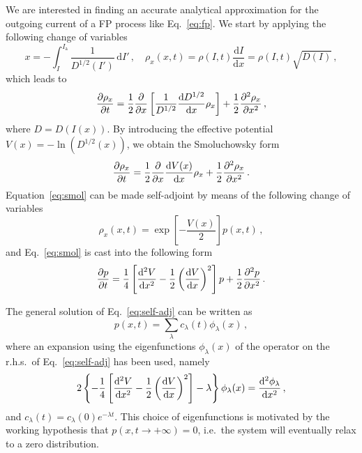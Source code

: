 We are interested in finding an accurate analytical approximation for the outgoing current of a FP process like Eq.~\eqref{eq:fp}. We start  by applying the following change of variables
\begin{equation}
    x = -\int_I^{I_\mathrm{a}} \frac{1}{D^{1/2}(I')}\,\mathrm{d}I'\,,\quad \rho_x(x,t)=\rho(I,t)\frac{\mathrm{d}I}{\mathrm{d}x}=\rho(I,t)\sqrt{D(I)} \, ,
\end{equation}
which leads to
\begin{equation}
    \pdv{\rho_x}{t} = \frac{1}{2}\pdv{x} \left[\frac{1}{D^{1/2}}\dv{D^{1/2}}{x}\rho_x\right]+\frac{1}{2}\pdv[2]{\rho_x}{x}\, ,
\end{equation}
where $D=D\left(I(x)\right)$. By introducing the effective potential $V(x)=-\ln(D^{1/2}(x))$, we obtain the Smoluchowsky form~\cite{hannes1996fokker}
\begin{equation}
    \pdv{\rho_x}{t} = \frac{1}{2}\pdv{x} \dv{V(x)}{x} \rho_x+\frac{1}{2}\pdv[2]{\rho_x}{x}\, .
    \label{eq:smol}
\end{equation}
Equation~\eqref{eq:smol} can be made self-adjoint by means of the following change of variables 
\begin{equation}
    \rho_x(x,t) = \exp\left[-\frac{V(x)}{2}\right]p(x,t) \, ,
\end{equation}
and Eq.~\eqref{eq:smol} is cast into the following form
\begin{equation}
    \pdv{p}{t} = \frac{1}{4}\left[\dv[2]{V}{x} - \frac{1}{2}\left(\dv{V}{x}\right)^2\right]p + \frac{1}{2}\pdv[2]{p}{x}\,.
    \label{eq:self-adj}
\end{equation}

The general solution of Eq.~\eqref{eq:self-adj} can be written as
\begin{equation}
    p(x,t) = \sum_\lambda c_\lambda(t)\phi_\lambda(x)\,,
    \label{eq:expansion}
\end{equation}
where an expansion using the eigenfunctions $\phi_\lambda(x)$ of the operator on the r.h.s.\ of Eq.~\eqref{eq:self-adj} has been used, namely 
\begin{equation}
    2\left\{-\frac{1}{4}\left[\dv[2]{V}{x} - \frac{1}{2}\left(\dv{V}{x}\right)^2\right] - \lambda \right\}\phi_\lambda(x) = \dv[2]{\phi_\lambda}{x}\,,
    \label{eq:eigenproblem}
\end{equation}
and $c_\lambda(t) = c_\lambda(0)e^{-\lambda t}$. This choice of eigenfunctions is motivated by the working hypothesis that $p(x,t\to+\infty)=0$, i.e.\ the system will eventually relax to a zero distribution.

